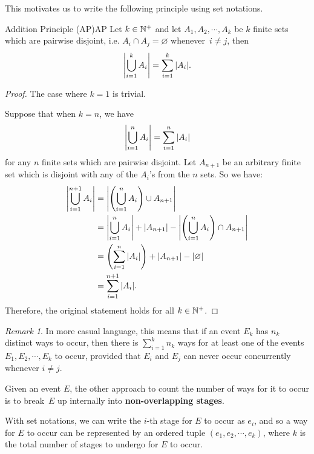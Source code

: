 \documentclass[math]{amznotes}
\theoremstyle{remark}
\newtheorem*{remark}{Remark}
\begin{document}
This motivates us to write the following principle using set notations.
\begin{thmbox}{Addition Principle (AP)}{AP}
    Let $k \in \mathbb{N}^+$ and let $A_1, A_2, \cdots, A_k$ be $k$ finite sets which are pairwise disjoint, i.e. $A_i \cap A_j = \varnothing$ whenever~$i \neq j$, then
   \begin{equation*}
        {\left\lvert {\bigcup_{i = 1}^k A_i} \right\rvert} = \sum_{i = 1}^{k}{\left\lvert {A_i} \right\rvert}.
   \end{equation*} 
   \tcblower
   \begin{proof}
        The case where $k = 1$ is trivial.

        Suppose that when $k = n$, we have
        \begin{equation*}
            {\left\lvert {\bigcup_{i = 1}^n A_i} \right\rvert} = \sum_{i = 1}^{n}{\left\lvert {A_i} \right\rvert}
        \end{equation*} 
        for any $n$ finite sets which are pairwise disjoint. Let $A_{n + 1}$ be an arbitrary finite set which is disjoint with any of the $A_i$'s from the $n$ sets. So we have:
        \begin{align*}
            {\left\lvert {\bigcup_{i = 1}^{n + 1} A_i} \right\rvert} & = {\left\lvert {\left(\bigcup_{i = 1}^n A_i\right) \cup A_{n + 1}} \right\rvert} \\
            & = {\left\lvert {\bigcup_{i = 1}^n A_i} \right\rvert} + {\left\lvert {A_{n + 1}} \right\rvert} - {\left\lvert {\left(\bigcup_{i = 1}^n A_i\right) \cap A_{n + 1}} \right\rvert} \\
            & = \left(\sum_{i = 1}^{n}{\left\lvert {A_i} \right\rvert}\right) + {\left\lvert {A_{n + 1}} \right\rvert} - {\left\lvert {\varnothing} \right\rvert} \\
            & = \sum_{i = 1}^{n + 1}{\left\lvert {A_i} \right\rvert}.
        \end{align*}
        Therefore, the original statement holds for all $k \in \mathbb{N}^+$.
   \end{proof}
\end{thmbox}
\begin{notebox}
    \begin{remark}
        In more casual language, this means that if an event $E_k$ has $n_k$ distinct ways to occur, then there is $\sum_{i = 1}^{k}n_k$ ways for at least one of the events $E_1, E_2, \cdots, E_k$ to occur, provided that $E_i$ and $E_j$ can never occur concurrently whenever $i \neq j$.
    \end{remark}
\end{notebox}
Given an event $E$, the other approach to count the number of ways for it to occur is to break~$E$ up internally into {\color{red} \textbf{non-overlapping stages}}.

With set notations, we can write the $i$-th stage for $E$ to occur as $e_i$, and so a way for $E$ to occur can be represented by an ordered tuple $(e_1, e_2, \cdots, e_k)$, where $k$ is the total number of stages to undergo for $E$ to occur.
\end{document}
